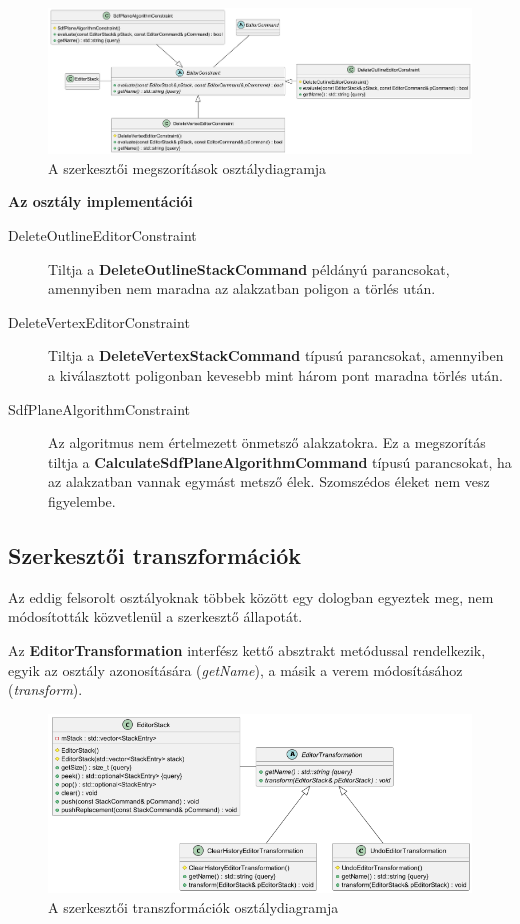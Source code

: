 \begin{figure}[H]
	\centering
	\includegraphics[width=1\linewidth]{images/class_editor_constraint.png}
	\caption{A szerkesztői megszorítások osztálydiagramja}
	\label{fig:class_editor_constraint-1}
\end{figure}

\textbf{Az osztály implementációi}

\begin{description}
	\item[DeleteOutlineEditorConstraint] Tiltja a \textbf{DeleteOutlineStackCommand} példányú parancsokat, amennyiben nem maradna az alakzatban poligon a törlés után.
	\item[DeleteVertexEditorConstraint] Tiltja a \textbf{DeleteVertexStackCommand} típusú parancsokat, amennyiben a kiválasztott poligonban kevesebb mint három pont maradna törlés után.
	\item[SdfPlaneAlgorithmConstraint] Az algoritmus nem értelmezett önmetsző alakzatokra. Ez a megszorítás tiltja a \textbf{CalculateSdfPlaneAlgorithmCommand} típusú parancsokat, ha az alakzatban vannak egymást metsző élek. Szomszédos éleket nem vesz figyelembe.
\end{description}

\subsection{Szerkesztői transzformációk}

Az eddig felsorolt osztályoknak többek között egy dologban egyeztek meg, nem módosították közvetlenül a szerkesztő állapotát.

Az \textbf{EditorTransformation} interfész kettő absztrakt metódussal rendelkezik, egyik az osztály azonosítására (\textit{getName}), a másik a verem módosításához (\textit{transform}).

\begin{figure}[H]
	\centering
	\includegraphics[width=1\linewidth]{images/class_editor_transformation.png}
	\caption{A szerkesztői transzformációk osztálydiagramja}
	\label{fig:class_editor_transformation-1}
\end{figure}


